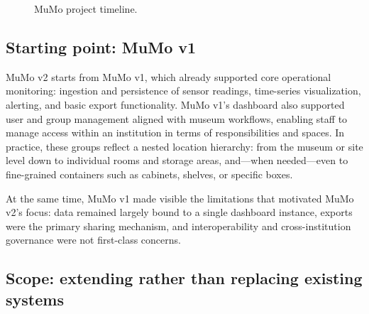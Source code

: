 \documentclass{ceurart}
\begin{document}
\begin{figure}[h]
\caption{MuMo project timeline.}
\label{fig:timeline}
\end{figure}

\subsection{Starting point: MuMo v1}\label{starting-point-mumo-v1}

MuMo v2 starts from MuMo v1, which already supported core operational
monitoring: ingestion and persistence of sensor readings, time-series
visualization, alerting, and basic export functionality. MuMo v1's
dashboard also supported user and group management aligned with museum
workflows, enabling staff to manage access within an institution in
terms of responsibilities and spaces. In practice, these groups reflect
a nested location hierarchy: from the museum or site level down to
individual rooms and storage areas, and---when needed---even to
fine-grained containers such as cabinets, shelves, or specific boxes.

At the same time, MuMo v1 made visible the limitations that motivated
MuMo v2's focus: data remained largely bound to a single dashboard
instance, exports were the primary sharing mechanism, and
interoperability and cross-institution governance were not first-class
concerns.

\subsection{Scope: extending rather than replacing existing
systems}\label{scope-extending-rather-than-replacing-existing-systems}
\end{document}
